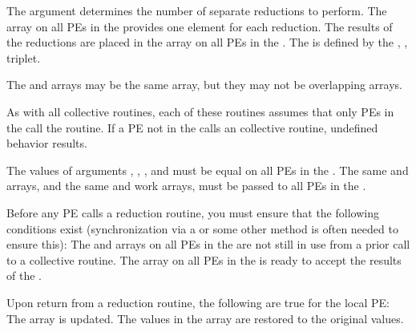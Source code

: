 \begin{apidefinition}
{    The  argument determines the number of separate reductions to
    perform.  The \source{} array on all \ac{PE}s in the \activeset{} provides one
    element for each reduction.  The results of the reductions are placed in the
    \dest{} array on all \ac{PE}s in the \activeset.  The \activeset{} is defined
    by the , ,  triplet.
    
    The \source{} and \dest{} arrays may be the same array, but they may not be
    overlapping arrays.
    
    As with all \openshmem{} collective routines, each of these routines assumes
    that only \ac{PE}s in the \activeset{} call the routine.  If a \ac{PE} not in
    the \activeset{} calls an \openshmem collective routine, undefined behavior
    results.
    
    The values of arguments , , , and
     must be equal on all \ac{PE}s in the \activeset. The same \dest{}
    and \source{} arrays, and the same  and  work arrays, must
    be passed to all \ac{PE}s in the \activeset.
    
    Before any \ac{PE} calls a reduction routine, you must ensure that the
    following conditions exist (synchronization via a  or some other
    method is often needed to ensure this): The  and  arrays
    on all \ac{PE}s in the \activeset{} are not still in use from a prior call to a
    collective \openshmem{} routine.  The \dest{} array on all \ac{PE}s in the
    \activeset{} is ready to accept the results of the .
    
    Upon return from a reduction routine, the following are true for the local
    \ac{PE}: The \dest{} array is updated.  The values in the  array are
    restored to the original values.
}


\end{apidefinition}
